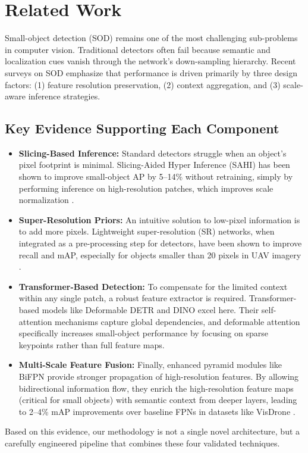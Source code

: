 \section{Related Work}
\label{sec:related_work}

Small-object detection (SOD) remains one of the most challenging sub-problems in computer vision. Traditional detectors often fail because semantic and localization cues vanish through the network's down-sampling hierarchy. Recent surveys on SOD emphasize that performance is driven primarily by three design factors: (1) feature resolution preservation, (2) context aggregation, and (3) scale-aware inference strategies.

\subsection{Key Evidence Supporting Each Component}

\begin{itemize}
    \item \textbf{Slicing-Based Inference:} Standard detectors struggle when an object's pixel footprint is minimal. Slicing-Aided Hyper Inference (SAHI) has been shown to improve small-object AP by 5--14\% without retraining, simply by performing inference on high-resolution patches, which improves scale normalization \cite{aksoy2022slicing}.

    \item \textbf{Super-Resolution Priors:} An intuitive solution to low-pixel information is to add more pixels. Lightweight super-resolution (SR) networks, when integrated as a pre-processing step for detectors, have been shown to improve recall and mAP, especially for objects smaller than 20 pixels in UAV imagery \cite{li2025superresolution}.

    \item \textbf{Transformer-Based Detection:} To compensate for the limited context within any single patch, a robust feature extractor is required. Transformer-based models like Deformable DETR \cite{zhu2021deformable} and DINO \cite{zhang2023dino} excel here. Their self-attention mechanisms capture global dependencies, and deformable attention specifically increases small-object performance by focusing on sparse keypoints rather than full feature maps.

    \item \textbf{Multi-Scale Feature Fusion:} Finally, enhanced pyramid modules like BiFPN \cite{tan2020efficientdet} provide stronger propagation of high-resolution features. By allowing bidirectional information flow, they enrich the high-resolution feature maps (critical for small objects) with semantic context from deeper layers, leading to 2--4\% mAP improvements over baseline FPNs in datasets like VisDrone \cite{zhu2023visdrone, fu2025bpdyolo}.
\end{itemize}

Based on this evidence, our methodology is not a single novel architecture, but a carefully engineered pipeline that combines these four validated techniques.